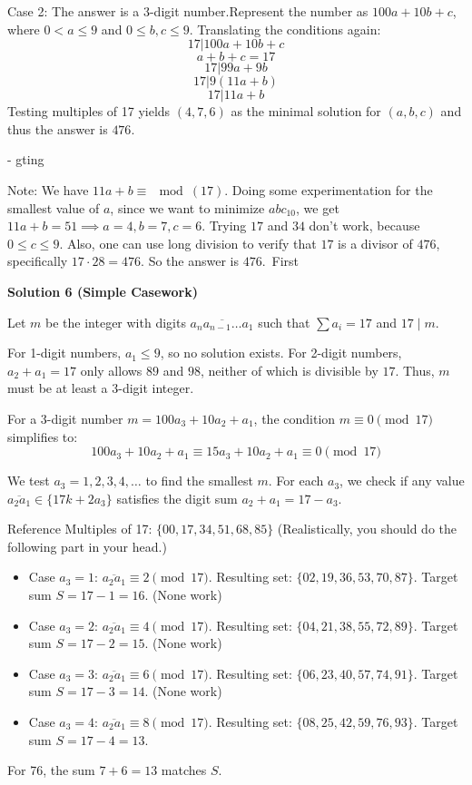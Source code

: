 \begin{enumerate}
 Case 2: The answer is a 3-digit number.Represent the number as $100a+10b+c$, where $0 < a \leq 9$ and $0 \leq b,c \leq 9$. Translating the conditions again:
 \[17|100a+10b+c\]
 \[a+b+c=17\]
 \[17|99a+9b\]
 \[17|9(11a+b)\]
 \[17|11a+b\]Testing multiples of 17 yields $(4, 7, 6)$ as the minimal solution for $(a, b, c)$ and thus the answer is $\boxed{476}$.

 - gting

 Note: We have $11a+b \equiv \mod(17)$. Doing some experimentation for the smallest value of $a$, since we want to minimize $abc_{10}$, we get $11a+b=51 \implies a=4, b=7, c=6$. Trying $17$ and $34$ don't work, because $0 \leq c \leq 9$. Also, one can use long division to verify that $17$ is a divisor of $476$, specifically $17 \cdot 28=476$. So the answer is $476$.~First

 



\textbf{Solution 6 (Simple Casework)}

Let $m$ be the integer with digits $\overline{a_n a_{n-1} \dots a_1}$ such that $\sum a_i = 17$ and $17 \mid m$.

 For 1-digit numbers, $a_1 \le 9$, so no solution exists. For 2-digit numbers, $a_2 + a_1 = 17$ only allows $89$ and $98$, neither of which is divisible by $17$. Thus, $m$ must be at least a 3-digit integer.

 For a 3-digit number $m = 100a_3 + 10a_2 + a_1$, the condition $m \equiv 0 \pmod{17}$ simplifies to:
 \[100a_3 + 10a_2 + a_1 \equiv 15a_3 + 10a_2 + a_1 \equiv 0 \pmod{17}\]

 We test $a_3 = 1, 2, 3, 4, \dots$ to find the smallest $m$. For each $a_3$, we check if any value $\overline{a_2a_1} \in \{17k + 2a_3\}$ satisfies the digit sum $a_2 + a_1 = 17 - a_3$.

 Reference Multiples of 17: $\{00, 17, 34, 51, 68, 85\}$ (Realistically, you should do the following part in your head.)

 
            \begin{itemize}
        \item Case $a_3 = 1$: $\overline{a_2a_1} \equiv 2 \pmod{17}$. Resulting set: $\{02, 19, 36, 53, 70, 87\}$. Target sum $S = 17 - 1 = 16$. (None work)
        \item Case $a_3 = 2$: $\overline{a_2a_1} \equiv 4 \pmod{17}$. Resulting set: $\{04, 21, 38, 55, 72, 89\}$. Target sum $S = 17 - 2 = 15$. (None work)
        \item Case $a_3 = 3$: $\overline{a_2a_1} \equiv 6 \pmod{17}$. Resulting set: $\{06, 23, 40, 57, 74, 91\}$. Target sum $S = 17 - 3 = 14$. (None work)
        \item Case $a_3 = 4$: $\overline{a_2a_1} \equiv 8 \pmod{17}$. Resulting set: $\{08, 25, 42, 59, 76, 93\}$. Target sum $S = 17 - 4 = 13$.
            \end{itemize}
            For 76, the sum $7+6=13$ matches $S$. 


\end{enumerate}
